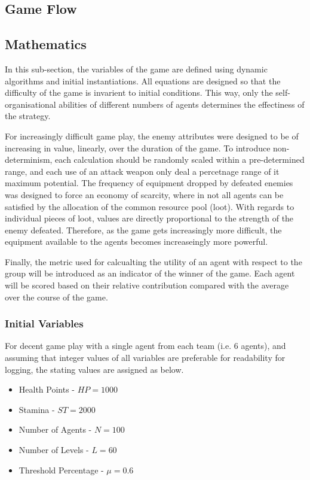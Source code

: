\subsection{Game Flow}\label{sec:game flow}


\subsection{Mathematics}\label{sec: maths}

In this sub-section, the variables of the game are defined using dynamic algorithms and initial instantiations. All equations are designed so that the difficulty of the game is invarient to initial conditions. This way, only the self-organisational abilities of different numbers of agents determines the effectiness of the strategy. 

For increasingly difficult game play, the enemy attributes were designed to be of increasing in value, linearly, over the duration of the game. To introduce non-determinism, each calculation should be randomly scaled within a pre-determined range, and each use of an attack weapon only deal a percetnage range of it maximum potential. The frequency of equipment dropped by defeated enemies was designed to force an economy of scarcity, where in not all agents can be satisfied by the allocation of the common resource pool (loot). With regards to individual pieces of loot, values are directly proportional to the strength of the enemy defeated. Therefore, as the game gets increasingly more difficult, the equipment available to the agents becomes increaseingly more powerful.  

Finally, the metric used for calcualting the utility of an agent with respect to the group will be introduced as an indicator of the winner of the game. Each agent will be scored based on their relative contribution compared with the average over the course of the game. 

\subsubsection{Initial Variables}\label{sec: initial variable}

For decent game play with a single agent from each team (i.e. 6 agents), and assuming that integer values of all variables are preferable for readability for logging, the stating values are assigned as below. 

\begin{itemize}
    \item Health Points - $HP = 1000$
    \item Stamina - $ST = 2000$
    \item Number of Agents - $N = 100$
    \item Number of Levels - $L = 60$
    \item Threshold Percentage - $\mu = 0.6$
\end{itemize}

